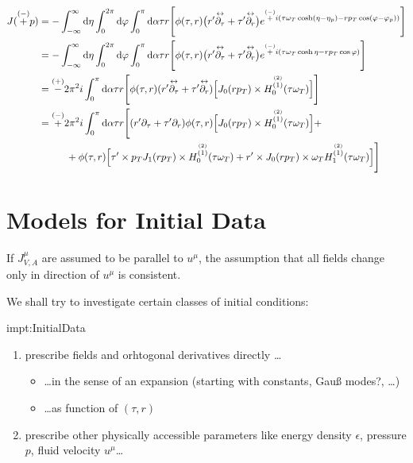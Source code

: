 \begin{subequations}
    \begin{align}
        J(\overset{(-)}{+}p) & =-\int_{-\infty}^\infty\text{d}\eta\int_0^{2\pi}\text{d}\varphi\int_0^\pi\text{d}\alpha\tau r\Bigg[\phi(\tau,r)\big(r^\prime\overset{\leftrightarrow}{\partial_\tau}+\tau^\prime\overset{\leftrightarrow}{\partial_r}\big)e^{\overset{(-)}{+}{i}(\tau \omega_T\cosh(\eta-\eta_p)-r p_T\cos(\varphi-\varphi_p))}\Bigg] \\
                           & =-\int_{-\infty}^\infty\text{d}\eta\int_0^{2\pi}\text{d}\varphi\int_0^\pi\text{d}\alpha\tau r\Bigg[\phi(\tau,r)\big(r^\prime\overset{\leftrightarrow}{\partial_\tau}+\tau^\prime\overset{\leftrightarrow}{\partial_r}\big)e^{\overset{(-)}{+}{i}(\tau \omega_T\cosh\eta-r p_T\cos\varphi)}\Bigg]                      \\
                           & =\overset{(+)}{-}2\pi^2{i}\int_0^\pi\text{d}\alpha\tau r\Bigg[\phi(\tau,r)(r^\prime\overset{\leftrightarrow}{\partial_\tau}+\tau^\prime\overset{\leftrightarrow}{\partial_r})\Big[J_0(r p_T)\times H_0^{\overset{(2)}{(1)}}(\tau\omega_T)\Big]\Bigg]                                                 \\
                           & =\overset{(-)}{+}2\pi^2{i}\int_0^\pi\text{d}\alpha\tau r\Bigg[(r^\prime\partial_\tau+\tau^\prime\partial_r)\phi(\tau,r)\Big[J_0(r p_T)\times H_0^{\overset{(2)}{(1)}}(\tau\omega_T)\Big]+\nonumber                                                                                             \\
                           & \phantom{=}\qquad + \phi(\tau,r)\Big[\tau^\prime\times p_T J_1(r p_T)\times H_0^{\overset{(2)}{(1)}}(\tau\omega_T)+r^\prime\times J_0(r p_T)\times\omega_T H_1^{\overset{(2)}{(1)}}(\tau\omega_T)\Big]\Bigg]
    \end{align}
\end{subequations}

\section{Models for Initial Data}

If $J^\mu_{V,A}$ are assumed to be parallel to $u^\mu$, the assumption that all fields change only in direction of $u^\mu$ is consistent.

We shall try to investigate certain classes of initial conditions:
\begin{impt}{impt:InitialData}
\begin{enumerate}
    \item prescribe fields and orhtogonal derivatives directly \dots
    \begin{itemize}
        \item \dots in the sense of an expansion (starting with constants, Gauß modes?, \dots)
        \item \dots as function of $(\tau,r)$
    \end{itemize}
    \item prescribe other physically accessible parameters like energy density $\epsilon$, pressure $p$, fluid velocity $u^\mu$\dots
\end{enumerate}
\end{impt}

